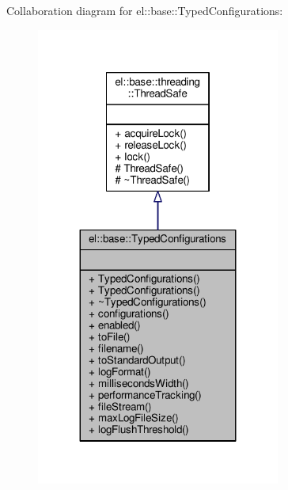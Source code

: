 Collaboration diagram for el\+:\+:base\+:\+:Typed\+Configurations\+:
\nopagebreak
\begin{figure}[H]
\begin{center}
\leavevmode
\includegraphics[width=227pt]{d7/d33/classel_1_1base_1_1TypedConfigurations__coll__graph}
\end{center}
\end{figure}
